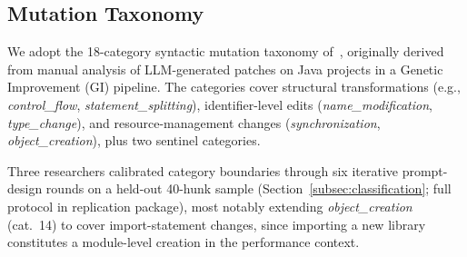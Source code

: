 \documentclass[runningheads]{llncs}
\begin{document}
%



\subsection{Mutation Taxonomy}
\label{subsec:taxonomy}

We adopt the 18-category syntactic mutation taxonomy
of~\cite{evenmendoza2025}, originally derived from manual analysis of
LLM-generated patches on Java projects in a Genetic Improvement (GI)
pipeline. The categories cover structural transformations (e.g.,
\emph{control\_flow}, \emph{statement\_splitting}), identifier-level edits
(\emph{name\_modification}, \emph{type\_change}), and resource-management
changes (\emph{synchronization}, \emph{object\_creation}), plus two
sentinel categories.

Three researchers calibrated category boundaries through six iterative
prompt-design rounds on a held-out 40-hunk sample
(Section~\ref{subsec:classification}; full protocol in replication
package), most notably extending \emph{object\_creation} (cat.~14) to
cover import-statement changes, since importing a new library constitutes a
module-level creation in the performance context.
\end{document}
